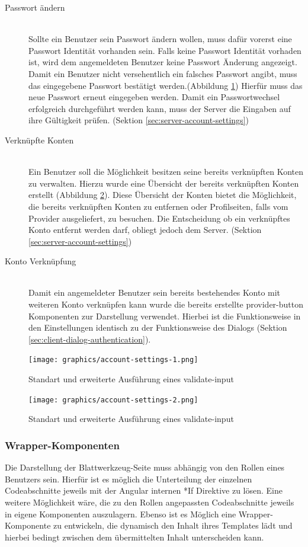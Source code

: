 \begin{description}
	\item[Passwort ändern]\hfill\\
	Sollte ein Benutzer sein Passwort ändern wollen, muss dafür vorerst eine Passwort Identität vorhanden sein. Falls keine Passwort Identität vorhaden ist, wird dem angemeldeten Benutzer keine Passwort Änderung angezeigt. Damit ein Benutzer nicht versehentlich ein falsches Passwort angibt, muss das eingegebene Passwort bestätigt werden.(Abbildung \ref{fig:account_settings_1}) Hierfür muss das neue Passwort erneut eingegeben werden. Damit ein Passwortwechsel erfolgreich durchgeführt werden kann, muss der Server die Eingaben auf ihre Gültigkeit prüfen. (Sektion \ref{sec:server-account-settings})
	\item[Verknüpfte Konten]\hfill\\
	Ein Benutzer soll die Möglichkeit besitzen seine bereits verknüpften Konten zu verwalten. Hierzu wurde eine Übersicht der bereits verknüpften Konten erstellt (Abbildung \ref{fig:account_settings_2}). Diese Übersicht der Konten bietet die Möglichkeit, die bereits verknüpften Konten zu entfernen oder Profilseiten, falls vom Provider ausgeliefert, zu besuchen. Die Entscheidung ob ein verknüpftes Konto entfernt werden darf, obliegt jedoch dem Server. (Sektion \ref{sec:server-account-settings})
	\item[Konto Verknüpfung]\hfill\\
	Damit ein angemeldeter Benutzer sein bereits bestehendes Konto mit weiteren Konto verknüpfen kann wurde die bereits erstellte provider-button Komponenten zur Darstellung verwendet. Hierbei ist die Funktionsweise in den Einstellungen identisch zu der Funktionsweise des Dialogs (Sektion \ref{sec:client-dialog-authentication}).
\end{description}

\begin{figure}
	\centering
	\texttt{[image: graphics/account-settings-1.png]}
	\caption{Standart und erweiterte Ausführung eines validate-input}
	\label{fig:account_settings_1}
\end{figure}

\begin{figure}
	\centering
	\texttt{[image: graphics/account-settings-2.png]}
	\caption{Standart und erweiterte Ausführung eines validate-input}
	\label{fig:account_settings_2}
\end{figure}

\subsubsection{Wrapper-Komponenten}
\label{sec:client-wrapper-components}
Die Darstellung der Blattwerkzeug-Seite muss abhängig von den Rollen eines Benutzers sein. Hierfür ist es möglich die Unterteilung der einzelnen Codeabschnitte jeweils mit der Angular internen *If Direktive zu lösen. Eine weitere Möglichkeit wäre, die zu den Rollen angepassten Codeabschnitte jeweils in eigene Komponenten auszulagern. Ebenso ist es Möglich eine Wrapper-Komponente zu entwickeln, die dynamisch den Inhalt ihres Templates lädt und hierbei bedingt zwischen dem übermittelten Inhalt unterscheiden kann. 

